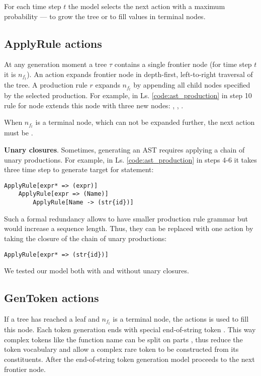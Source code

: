 For each time step $t$ the model selects the next action with a maximum probability ---  to grow the tree or  to fill values in terminal nodes. 

\subsection{ApplyRule actions}

At any generation moment a tree $\tau$ contains a single frontier node (for time step $t$ it is $n_{f_t}$). An action  expands frontier node in depth-first, left-to-right traversal of the tree. A production rule $r$ expands $n_{f_t}$ by appending all child nodes specified by the selected production. For example, in Ls. \ref{code:ast_production} in step 10 rule for node  extends this node with three new nodes: , , . 

When $n_{f_t}$ is a terminal node, which can not be expanded further, the next action must be .

\textbf{Unary closures}. Sometimes, generating an AST requires applying a chain of unary productions. For example, in Ls. \ref{code:ast_production} in steps 4-6 it takes three time step to generate target for  statement:

\begin{verbatim}
ApplyRule[expr* => (expr)]
    ApplyRule[expr => (Name)]
        ApplyRule[Name -> (str{id})]
\end{verbatim}

Such a formal redundancy allows to have smaller production rule grammar but would increase a sequence length. Thus, they can be replaced with one action by taking the closure of the chain of unary productions:

\begin{verbatim}
ApplyRule[expr* => (str{id})]
\end{verbatim}

We tested our model both with and without unary closures.

\subsection{GenToken actions} \label{gentoken}
If a tree has reached a leaf and $n_{f_t}$ is a terminal node, the  actions is used to fill this node. Each token generation ends with special end-of-string token . This way complex tokens like the function name  can be split on parts , thus reduce the token vocabulary and allow a complex rare token to be constructed from its constituents. After the end-of-string token generation model proceeds to the next frontier node.

